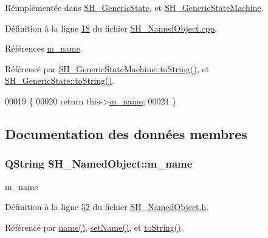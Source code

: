 Réimplémentée dans \hyperlink{classSH__GenericState_a7779babbb40f3f8faa71112204d9804f}{S\-H\-\_\-\-Generic\-State}, et \hyperlink{classSH__GenericStateMachine_a85c0c1c9d258ae991f84667412fa47cd}{S\-H\-\_\-\-Generic\-State\-Machine}.



Définition à la ligne \hyperlink{SH__NamedObject_8cpp_source_l00018}{18} du fichier \hyperlink{SH__NamedObject_8cpp_source}{S\-H\-\_\-\-Named\-Object.\-cpp}.



Références \hyperlink{classSH__NamedObject_a7f8e3346256986c337a792339ea5a015}{m\-\_\-name}.



Référencé par \hyperlink{classSH__GenericStateMachine_a85c0c1c9d258ae991f84667412fa47cd}{S\-H\-\_\-\-Generic\-State\-Machine\-::to\-String()}, et \hyperlink{classSH__GenericState_a7779babbb40f3f8faa71112204d9804f}{S\-H\-\_\-\-Generic\-State\-::to\-String()}.


\begin{DoxyCode}
00019 \{
00020     \textcolor{keywordflow}{return} this->\hyperlink{classSH__NamedObject_a7f8e3346256986c337a792339ea5a015}{m\_name};
00021 \}
\end{DoxyCode}


\subsection{Documentation des données membres}
\hypertarget{classSH__NamedObject_a7f8e3346256986c337a792339ea5a015}{
\subsubsection[{m\-\_\-name}]{\setlength{\rightskip}{0pt plus 5cm}Q\-String S\-H\-\_\-\-Named\-Object\-::m\-\_\-name\hspace{0.3cm}{\ttfamily [private]}}}\label{classSH__NamedObject_a7f8e3346256986c337a792339ea5a015}


m\-\_\-name 



Définition à la ligne \hyperlink{SH__NamedObject_8h_source_l00052}{52} du fichier \hyperlink{SH__NamedObject_8h_source}{S\-H\-\_\-\-Named\-Object.\-h}.



Référencé par \hyperlink{classSH__NamedObject_a9f686c6f2a5bcc08ad03d0cee0151f0f}{name()}, \hyperlink{classSH__NamedObject_a6bc164e6fa10ae190770529af75d1775}{set\-Name()}, et \hyperlink{classSH__NamedObject_a9f4b19df6a96a17daaf1060b3019ef47}{to\-String()}.

